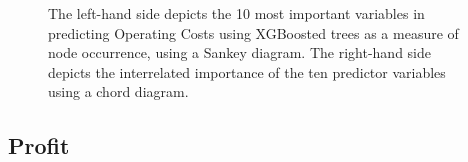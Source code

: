\documentclass[review,12pt,authoryear]{elsarticle}
\begin{document}
\begin{linenumbers}
%
%

\begin{figure}
 \caption{The left-hand side depicts the 10 most important variables in predicting Operating Costs using XGBoosted trees as a measure of node occurrence, using a Sankey diagram. The right-hand side depicts the interrelated importance of the ten predictor variables using a chord diagram.}\label{fig:operating_costs_sankey}
\end{figure}

\subsection{Profit}


\end{linenumbers}
\end{document}
